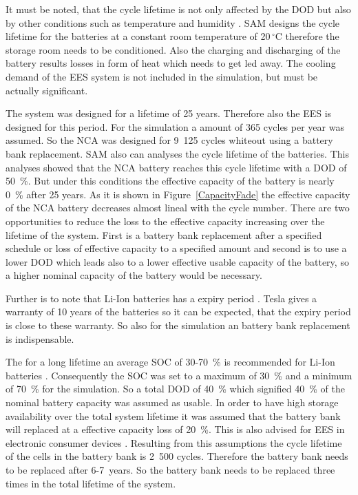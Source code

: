 It must be noted, that the cycle lifetime is not only affected by the DOD but also by other conditions such as temperature and humidity \cite{MitElectricVehilceTeam2008}. SAM designs the cycle lifetime for the batteries at a constant room temperature of 20$\,^{\circ}\mathrm{C}$ therefore the storage room needs to be conditioned. Also the charging and discharging of the battery results losses in form of heat which needs to get led away. The cooling demand of the EES system is not included in the simulation, but must be actually significant. \cite{Diorio2015} 



The system was designed for a lifetime of 25 years. Therefore also the EES is designed for this period. For the simulation a amount of 365 cycles per year was assumed. So the NCA was designed for 9~125 cycles whiteout using a battery bank replacement. SAM also can analyses the cycle lifetime of the batteries. This analyses showed that the NCA battery reaches this cycle lifetime with a DOD of 50~\%. But under this conditions the effective capacity of the battery is nearly 0~\% after 25 years. As it is shown in Figure~\ref{CapacityFade} the effective capacity of the NCA battery decreases almost lineal with the cycle number. There are two opportunities to reduce the loss to the effective capacity increasing over the lifetime of the system. First is a battery bank replacement after a specified schedule or loss of effective capacity to a specified amount and second is to use a lower DOD which leads also to a lower effective usable capacity of the battery, so a higher nominal capacity of the battery would be necessary.



Further is to note that Li-Ion batteries has a expiry period \cite{Jossen2006}. Tesla gives a warranty of 10 years of the batteries \cite{Shahan2015} so it can be expected, that the expiry period is close to these warranty. So also for the simulation an battery bank replacement is indispensable.



The for a long lifetime an average SOC of 30-70~\% is recommended for Li-Ion batteries \cite{Jossen2006}. Consequently the SOC was set to a maximum of 30~\% and a minimum of 70~\% for the simulation. So a total DOD of 40~\% which signified 40~\% of the nominal battery capacity was assumed as usable. In order to have high storage availability over the total system lifetime it was assumed that the battery bank will replaced at a effective capacity loss of 20~\%. This is also advised for EES in electronic consumer devices \cite{Spotnitz2003}. Resulting from this assumptions the cycle lifetime of the cells in the battery bank is 2~500 cycles. Therefore the battery bank needs to be replaced after 6-7~years. So the battery bank needs to be replaced three times in the total lifetime of the system. 



